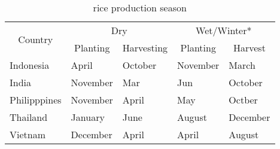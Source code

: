 \begin{table}
\centering
\caption{rice production season}
\label{table:rice-production-season}
\begin{tabular}{lllll}
\hline
\multicolumn{1}{c}{\multirow{2}{*}{Country}} & \multicolumn{2}{c}{Dry}                                       & \multicolumn{2}{c}{Wet/Winter*}                            \\
\cline{2-5}
\multicolumn{1}{c}{}                         & \multicolumn{1}{c}{Planting} & \multicolumn{1}{c}{Harvesting} & \multicolumn{1}{c}{Planting} & \multicolumn{1}{c}{Harvest} \\
\hline
Indonesia                                    & April                        & October                        & November                     & March                       \\
India                                        & November                     & Mar                            & Jun                          & October                     \\
Philipppines                                 & November                     & April                          & May                          & Octber                      \\
Thailand                                     & January                      & June                           & August                       & December                    \\
Vietnam                                      & December                     & April                          & April                        & August      \\
\hline               
\end{tabular}
\end{table}